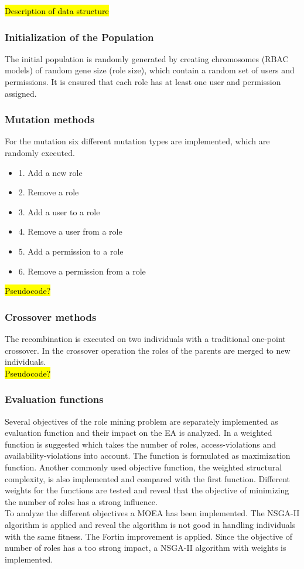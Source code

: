     \hl{Description of data structure}

    \subsubsection{Initialization of the Population}
    The initial population is randomly generated by creating chromosomes (RBAC models) of random gene size (role size), which contain a random set of users and permissions. It is ensured that each role has at least one user and permission assigned.
    
    \subsubsection{Mutation methods}
    For the mutation six different mutation types are implemented, which are randomly executed.
    \begin{itemize}
        \item 1. Add a new role
        \item 2. Remove a role
        \item 3. Add a user to a role
        \item 4. Remove a user from a role
        \item 5. Add a permission to a role
        \item 6. Remove a permission from a role
    \end{itemize}
    
    \hl{Pseudocode?}
    
    \subsubsection{Crossover methods}
    The recombination is executed on two individuals with a traditional one-point crossover. In the crossover operation the roles of the parents are merged to new individuals.\\
    \hl{Pseudocode?}
    
    \subsubsection{Evaluation functions}
    Several objectives of the role mining problem are separately implemented as evaluation function and their impact on the EA is analyzed. In \cite{saenko2012design} a weighted function is suggested which takes the number of roles, access-violations and availability-violations into account. The function is formulated as maximization function. Another commonly used objective function, the weighted structural complexity, is also implemented and compared with the first function. Different weights for the functions are tested and reveal that the objective of minimizing the number of roles has a strong influence.\\
    To analyze the different objectives a MOEA has been implemented. The NSGA-II algorithm is applied and reveal the algorithm is not good in handling individuals with the same fitness. The Fortin improvement is applied. Since the objective of number of roles has a too strong impact, a NSGA-II algorithm with weights is implemented.\\
    
